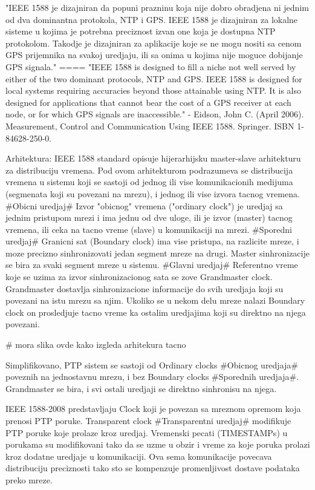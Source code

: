 \documentclass[a4paper,12pt, master]{etf}
\begin{document}
	"IEEE 1588 je dizajniran da popuni prazninu koja nije dobro obradjena ni jednim od dva
	dominantna protokola, NTP i GPS. IEEE 1588 je dizajniran za lokalne sisteme u kojima je
	potrebna preciznost izvan one koja je dostupna NTP protokolom. Takodje je dizajniran za
	aplikacije koje se ne mogu nositi sa cenom GPS prijemnika na svakoj uredjaju, ili sa onima u
	kojima nije moguce dobijanje GPS signala."
	====
	"IEEE 1588 is designed to fill a niche not well served by either of the two dominant protocols,
	NTP and GPS. IEEE 1588 is designed for local systems requiring accuracies beyond those
	attainable using NTP. It is also designed for applications that cannot bear the cost of a GPS
	receiver at each node, or for which GPS signals are inaccessible." - Eidson, John C. (April
	2006). Measurement, Control and Communication Using IEEE 1588. Springer. ISBN 1-84628-250-0.

	Arhitektura:
	IEEE 1588 standard opisuje hijerarhijsku master-slave arhitekturu za distribuciju vremena. Pod
	ovom arhitekturom podrazumeva se distribucija vremena u sistemu koji se sastoji od jednog ili
	vise komunikacionih medijuma (segmenata koji su povezani na mrezu), i jednog ili vise izvora
	tacnog vremena. \#Obicni uredjaj\# Izvor "obicnog" vremena ("ordinary clock") je uredjaj sa
	jednim pristupom mrezi i ima jednu od dve uloge, ili je izvor  (master) tacnog vremena, ili
	ceka na tacno vreme (slave) u komunikaciji na mrezi. \#Sporedni uredjaj\# Granicni sat (Boundary
	clock) ima vise pristupa, na razlicite mreze, i moze precizno sinhronizovati jedan segment
	mreze na drugi. Master sinhronizacije se bira za svaki segment mreze u sistemu. \#Glavni
	uredjaj\# Referentno vreme koje se uzima za izvor sinhronizacionog sata se zove Grandmaster
	clock. Grandmaster dostavlja sinhronizacione informacije do svih uredjaja koji su povezani na
	istu mrezu sa njim. Ukoliko se u nekom delu mreze nalazi Boundary clock on prosledjuje tacno
	vreme ka ostalim uredjajima koji su direktno na njega povezani.

	\# mora slika ovde kako izgleda arhitekura tacno

	Simplifikovano, PTP sistem se sastoji od Ordinary clocks \#Obicnog uredjaja\# poveznih na
	jednostavnu mrezu, i bez Boundary clocks \#Sporednih uredjaja\#. Grandmaster se bira, i svi
	ostali uredjaji se direktno sinhronisu na njega.

	IEEE 1588-2008 predstavljaju Clock koji je povezan sa mreznom opremom koja prenosi PTP poruke.
	Transparent clock \#Transparentni uredjaj\# modifikuje PTP poruke koje prolaze kroz uredjaj.
	Vremenski pecati (TIMESTAMPs) u porukama su modifikovani tako da se uzme u obzir i vreme za
	koje poruka prolazi kroz dodatne uredjaje u komunikaciji. Ova sema komunikacije povecava
	distribuciju preciznosti tako sto se kompenzuje promenljivost dostave podataka preko mreze.
\end{document}
